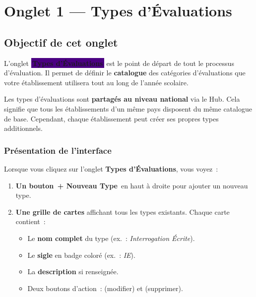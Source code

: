 \documentclass[12pt,a4paper]{report}
\newcommand{\bouton}[1]{{\colorbox{emerald}{\small\sffamily\bfseries\color{white}\,#1\,}}}
\newcommand{\onglet}[1]{{\colorbox{indigo}{\small\sffamily\bfseries\color{white}\,#1\,}}}
\begin{document}
\newpage
\chapter{Onglet 1 — Types d'Évaluations}

\section{Objectif de cet onglet}

L'onglet \onglet{Types d'Évaluations} est le point de départ de tout le processus d'évaluation. Il permet de définir le \textbf{catalogue} des catégories d'évaluations que votre établissement utilisera tout au long de l'année scolaire.

\begin{info}
Les types d'évaluations sont \textbf{partagés au niveau national} via le Hub. Cela signifie que tous les établissements d'un même pays disposent du même catalogue de base. Cependant, chaque établissement peut créer ses propres types additionnels.
\end{info}

\subsection{Présentation de l'interface}

Lorsque vous cliquez sur l'onglet \textbf{Types d'Évaluations}, vous voyez~:

\begin{enumerate}[leftmargin=1.2cm]
  \item \textbf{Un bouton \bouton{+ Nouveau Type}} en haut à droite pour ajouter un nouveau type.
  \item \textbf{Une grille de cartes} affichant tous les types existants. Chaque carte contient~:
  \begin{itemize}
    \item Le \textbf{nom complet} du type (ex.\ : \textit{Interrogation Écrite}).
    \item Le \textbf{sigle} en badge coloré (ex.\ : \textit{IE}).
    \item La \textbf{description} si renseignée.
    \item Deux boutons d'action~: \textcolor{indigo}{\faPen} (modifier) et \textcolor{rose}{\faTrash} (supprimer).
  \end{itemize}
\end{enumerate}
\end{document}

